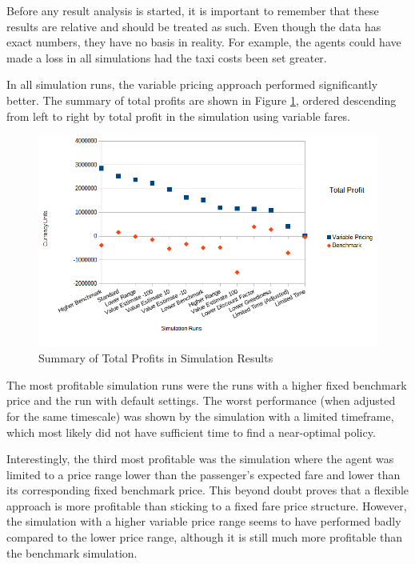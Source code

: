 Before any result analysis is started, it is important to remember that these
results are relative and should be treated as such. Even though the data has
exact numbers, they have no basis in reality. For example, the agents could
have made a loss in all simulations had the taxi costs been set greater.

In all simulation runs, the variable pricing approach performed significantly
better. The summary of total profits are shown in Figure
\ref{figure:results:total_profit}, ordered descending from left to right by
total profit in the simulation using variable fares.

\begin{figure}
\begin{center}
  \includegraphics[width=\textwidth]{../figures/total_profit}
  \caption{
    Summary of Total Profits in Simulation Results
    \label{figure:results:total_profit}
  }
\end{center}
\end{figure}

The most profitable simulation runs were the runs with a higher fixed benchmark
price and the run with default settings. The worst performance (when adjusted
for the same timescale) was shown by the simulation with a limited timeframe,
which most likely did not have sufficient time to find a near-optimal policy.

Interestingly, the third most profitable was the simulation where the agent was
limited to a price range lower than the passenger's expected fare and lower
than its corresponding fixed benchmark price. This beyond doubt proves that a
flexible approach is more profitable than sticking to a fixed fare price
structure. However, the simulation with a higher variable price range seems to
have performed badly compared to the lower price range, although it is still
much more profitable than the benchmark simulation.

